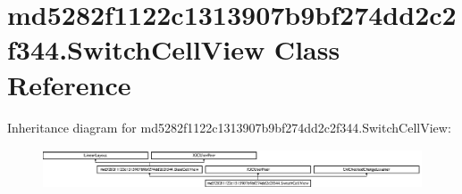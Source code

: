 \hypertarget{classmd5282f1122c1313907b9bf274dd2c2f344_1_1SwitchCellView}{}\section{md5282f1122c1313907b9bf274dd2c2f344.\+Switch\+Cell\+View Class Reference}
\label{classmd5282f1122c1313907b9bf274dd2c2f344_1_1SwitchCellView}
Inheritance diagram for md5282f1122c1313907b9bf274dd2c2f344.\+Switch\+Cell\+View\+:\begin{figure}[H]
\begin{center}
\leavevmode
\includegraphics[height=1.203438cm]{classmd5282f1122c1313907b9bf274dd2c2f344_1_1SwitchCellView}
\end{center}
\end{figure}
